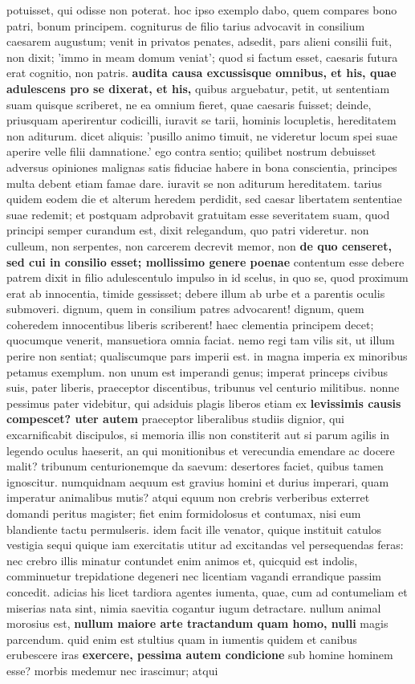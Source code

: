 potuisset, qui odisse non poterat. hoc ipso exemplo dabo, quem compares bono patri, bonum principem. cogniturus de filio tarius advocavit in consilium caesarem augustum; venit in privatos penates, adsedit, pars alieni consilii fuit, non dixit; 'immo in meam domum veniat'; quod si factum esset, caesaris futura erat cognitio, non patris. \textbf{\textbf{audita \textbf{causa excussisque omnibus, et \textbf{his,} quae} adulescens} pro se dixerat, et his,} quibus arguebatur, petit, ut sententiam suam quisque scriberet, ne ea omnium fieret, quae caesaris fuisset; deinde, priusquam aperirentur codicilli, iuravit se tarii, hominis locupletis, hereditatem non aditurum. dicet aliquis: 'pusillo animo timuit, ne videretur locum spei suae aperire velle filii damnatione.' ego contra sentio; quilibet nostrum debuisset adversus opiniones malignas satis fiduciae habere in bona conscientia, principes multa debent etiam famae dare. iuravit se non aditurum hereditatem. tarius quidem eodem die et alterum heredem perdidit, sed caesar libertatem sententiae suae redemit; et postquam adprobavit gratuitam esse severitatem suam, quod principi semper curandum est, dixit relegandum, quo patri videretur. non culleum, non serpentes, non carcerem decrevit memor, non \textbf{de quo censeret, sed cui in \textbf{consilio esset;} mollissimo genere poenae} contentum esse debere patrem dixit in filio adulescentulo impulso in id scelus, in quo se, quod proximum erat ab innocentia, timide gessisset; debere illum ab urbe et a parentis oculis submoveri. dignum, quem in consilium patres advocarent! dignum, quem coheredem innocentibus liberis scriberent! haec clementia principem decet; quocumque venerit, mansuetiora omnia faciat. nemo regi tam vilis sit, ut illum perire non sentiat; qualiscumque pars imperii est. in magna imperia ex minoribus petamus exemplum. non unum est imperandi genus; imperat princeps civibus suis, pater liberis, praeceptor discentibus, tribunus vel centurio militibus. nonne pessimus pater videbitur, qui adsiduis plagis liberos etiam ex \textbf{levissimis causis compescet? uter autem} praeceptor liberalibus studiis dignior, qui excarnificabit discipulos, si memoria illis non constiterit aut si parum agilis in legendo oculus haeserit, an qui monitionibus et verecundia emendare ac docere malit? tribunum centurionemque da saevum: desertores faciet, quibus tamen ignoscitur. numquidnam aequum est gravius homini et durius imperari, quam imperatur animalibus mutis? atqui equum non crebris verberibus exterret domandi peritus magister; fiet enim formidolosus et contumax, nisi eum blandiente tactu permulseris. idem facit ille venator, quique instituit catulos vestigia sequi quique iam exercitatis utitur ad excitandas vel persequendas feras: nec crebro illis minatur contundet enim animos et, quicquid est indolis, comminuetur trepidatione degeneri nec licentiam vagandi errandique passim concedit. adicias his licet tardiora agentes iumenta, quae, cum ad contumeliam et miserias nata sint, nimia saevitia cogantur iugum detractare. nullum animal morosius est, \textbf{nullum maiore arte tractandum quam homo, nulli} magis parcendum. quid enim est stultius quam in iumentis quidem et canibus erubescere iras \textbf{exercere, pessima autem condicione} sub homine hominem esse? morbis medemur nec irascimur; atqui 